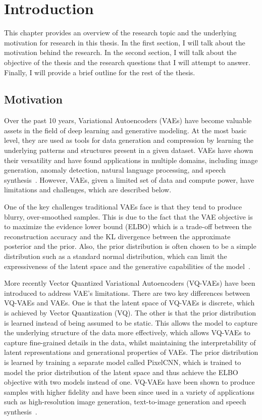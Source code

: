 \chapter{Introduction}

This chapter provides an overview of the research topic and the underlying motivation for research in this thesis. In the first section, I will talk about the motivation behind the research. In the second section, I will talk about the objective of the thesis and the research questions that I will attempt to answer. Finally, I will provide a brief outline for the rest of the thesis.

\section{Motivation}

Over the past 10 years, Variational Autoencoders (VAEs) have become valuable assets in the field of deep learning and generative modeling. At the most basic level, they are used as tools for data generation and compression by learning the underlying patterns and structures present in a given dataset. VAEs have shown their versatility and have found applications in multiple domains, including image generation, anomaly detection, natural language processing, and speech synthesis~\cite{kingma2013autoencoding, Kingma_2019, vqvae, dalle}. However, VAEs, given a limited set of data and compute power, have limitations and challenges, which are described below.

One of the key challenges traditional VAEs face is that they tend to produce blurry, over-smoothed samples. This is due to the fact that the VAE objective is to maximize the evidence lower bound (ELBO) which is a trade-off between the reconstruction accuracy and the KL divergence between the approximate posterior and the prior. Also, the prior distribution is often chosen to be a simple distribution such as a standard normal distribution, which can limit the expressiveness of the latent space and the generative capabilities of the model~\cite{Kingma_2019}.

More recently Vector Quantized Variational Autoencoders (VQ-VAEs) have been introduced to address VAE's limitations. There are two key differences between VQ-VAEs and VAEs. One is that the latent space of VQ-VAEs is discrete, which is achieved by Vector Quantization (VQ). The other is that the prior distribution is learned instead of being assumed to be static. This allows the model to capture the underlying structure of the data more effectively, which allows VQ-VAEs to capture fine-grained details in the data, whilst maintaining the interpretability of latent representations and generational properties of VAEs. The prior distribution is learned by training a separate model called PixelCNN, which is trained to model the prior distribution of the latent space and thus achieve the ELBO objective with two models instead of one. VQ-VAEs have been shown to produce samples with higher fidelity and have been since used in a variety of applications such as high-resolution image generation, text-to-image generation and speech synthesis~\cite{vqvae,vqvae2, dalle}.


